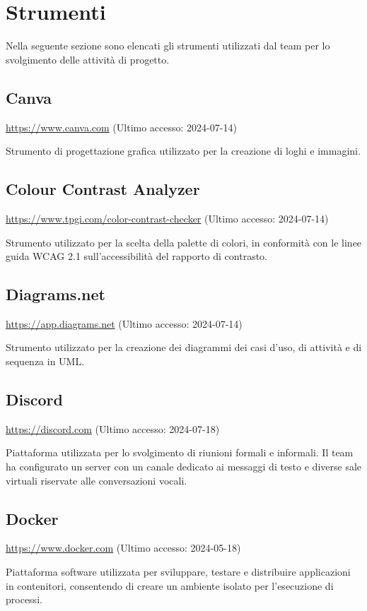 \section{Strumenti}
\par Nella seguente sezione sono elencati gli strumenti utilizzati dal team per lo svolgimento delle attività di progetto.

\subsection{Canva}
\par \href{https://www.canva.com}{https://www.canva.com} (Ultimo accesso: 2024-07-14)
\par Strumento di progettazione grafica utilizzato per la creazione di loghi e immagini.

\subsection{Colour Contrast Analyzer}
\par \href{https://www.tpgi.com/color-contrast-checker}{https://www.tpgi.com/color-contrast-checker} (Ultimo accesso: 2024-07-14)
\par Strumento utilizzato per la scelta della palette di colori, in conformità con le linee guida WCAG 2.1 sull'accessibilità del rapporto di contrasto.

\subsection{Diagrams.net}
\par \href{https://app.diagrams.net}{https://app.diagrams.net} (Ultimo accesso: 2024-07-14)
\par Strumento utilizzato per la creazione dei diagrammi dei casi d'uso, di attività e di sequenza in UML.

\subsection{Discord}
\par \href{https://discord.com}{https://discord.com} (Ultimo accesso: 2024-07-18)
\par Piattaforma utilizzata per lo svolgimento di riunioni formali e informali. Il team ha configurato un server con un canale dedicato ai messaggi di testo e diverse sale virtuali riservate alle conversazioni vocali.
    
\subsection{Docker}
\par \href{https://www.docker.com}{https://www.docker.com} (Ultimo accesso: 2024-05-18)
\par Piattaforma software utilizzata per sviluppare, testare e distribuire applicazioni in contenitori, consentendo di creare un ambiente isolato per l'esecuzione di processi.

